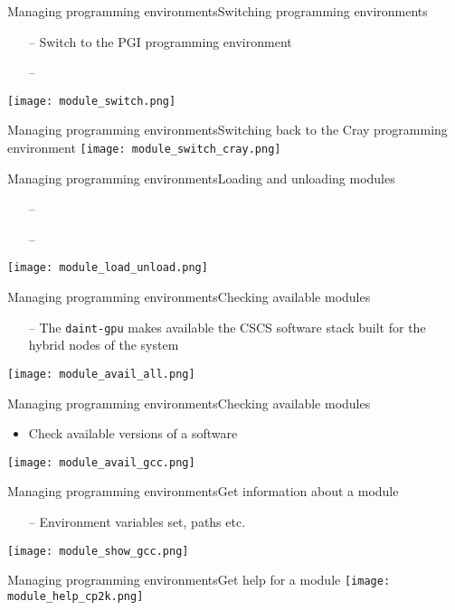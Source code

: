 \begin{frame}{Managing programming environments}{Switching programming environments}
  \begin{itemize}
  \item[--] Switch to the PGI programming environment
  \item[--] 
  \end{itemize}
  {
    \centering
    \texttt{[image: module\_switch.png]}
  }
\end{frame}

\begin{frame}{Managing programming environments}{Switching back to the Cray programming environment}
  {
    \centering
    \texttt{[image: module\_switch\_cray.png]}
  }
\end{frame}

\begin{frame}{Managing programming environments}{Loading and unloading modules}
  \begin{itemize}
  \item[--] 
  \item[--] 
  \end{itemize}

  {
    \centering
    \texttt{[image: module\_load\_unload.png]}
  }
\end{frame}


\begin{frame}{Managing programming environments}{Checking available modules}
  \begin{itemize}
  \item[--] The \texttt{daint-gpu} makes available the CSCS software stack built for the hybrid nodes of the system
  \end{itemize}
  {
    \centering
    \texttt{[image: module\_avail\_all.png]}
  }
\end{frame}

\begin{frame}{Managing programming environments}{Checking available modules}
  \begin{itemize}
  \item Check available versions of a software
  \end{itemize}
  {
    \centering
    \texttt{[image: module\_avail\_gcc.png]}
  }
\end{frame}

\begin{frame}{Managing programming environments}{Get information about a module}
  \begin{itemize}
  \item[--] Environment variables set, paths etc.
  \end{itemize}

  {
    \centering
    \texttt{[image: module\_show\_gcc.png]}
  }
\end{frame}


\begin{frame}{Managing programming environments}{Get help for a module}
  {
    \centering
    \texttt{[image: module\_help\_cp2k.png]}
  }
\end{frame}
